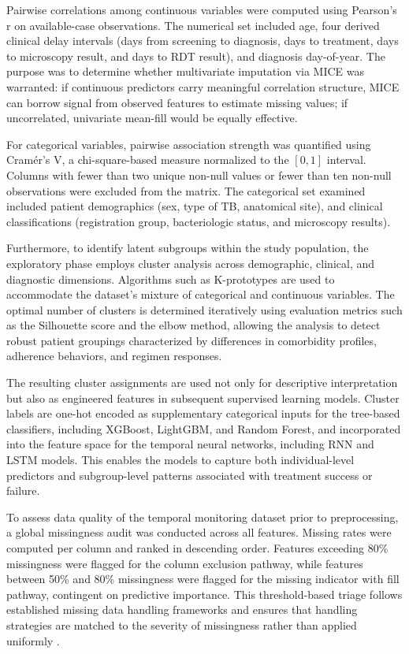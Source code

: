 \documentclass[12pt]{article}
\begin{document}
Pairwise correlations among continuous variables were computed using Pearson's r on available-case observations. The numerical set included age, four derived clinical delay intervals (days from screening to diagnosis, days to treatment, days to microscopy result, and days to RDT result), and diagnosis day-of-year. The purpose was to determine whether multivariate imputation via MICE was warranted: if continuous predictors carry meaningful correlation structure, MICE can borrow signal from observed features to estimate missing values; if uncorrelated, univariate mean-fill would be equally effective.

For categorical variables, pairwise association strength was quantified using Cram\'{e}r's V, a chi-square-based measure normalized to the \([0, 1]\) interval. Columns with fewer than two unique non-null values or fewer than ten non-null observations were excluded from the matrix. The categorical set examined included patient demographics (sex, type of TB, anatomical site), and clinical classifications (registration group, bacteriologic status, and microscopy results).

Furthermore, to identify latent subgroups within the study population, the exploratory phase employs cluster analysis across demographic, clinical, and diagnostic dimensions. Algorithms such as K-prototypes are used to accommodate the dataset's mixture of categorical and continuous variables. The optimal number of clusters is determined iteratively using evaluation metrics such as the Silhouette score and the elbow method, allowing the analysis to detect robust patient groupings characterized by differences in comorbidity profiles, adherence behaviors, and regimen responses.

The resulting cluster assignments are used not only for descriptive interpretation but also as engineered features in subsequent supervised learning models. Cluster labels are one-hot encoded as supplementary categorical inputs for the tree-based classifiers, including XGBoost, LightGBM, and Random Forest, and incorporated into the feature space for the temporal neural networks, including RNN and LSTM models. This enables the models to capture both individual-level predictors and subgroup-level patterns associated with treatment success or failure.

To assess data quality of the temporal monitoring dataset prior to preprocessing, a global missingness audit was conducted across all features. Missing rates were computed per column and ranked in descending order. Features exceeding 80\% missingness were flagged for the column exclusion pathway, while features between 50\% and 80\% missingness were flagged for the missing indicator with fill pathway, contingent on predictive importance. This threshold-based triage follows established missing data handling frameworks and ensures that handling strategies are matched to the severity of missingness rather than applied uniformly \citep{ref31}.
\end{document}
